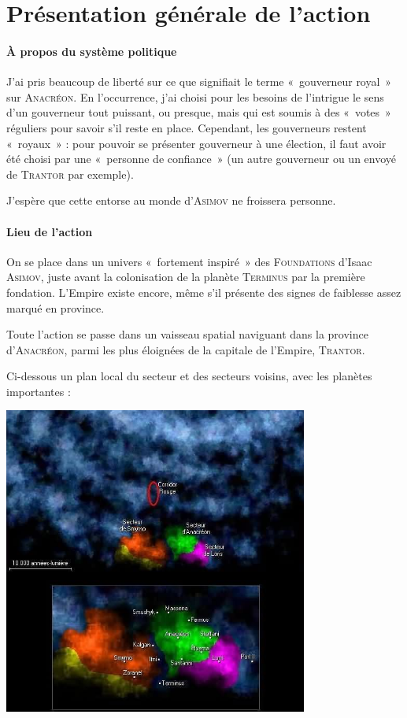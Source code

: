 \documentclass{article}
\begin{document}
\section{Présentation générale de l’action}

\paragraph{À propos du système politique}
{
J’ai pris beaucoup de liberté sur ce que signifiait le terme «~gouverneur royal~» sur \textsc{Anacréon}.
En l’occurrence, j’ai choisi pour les besoins de l’intrigue le sens d’un gouverneur tout puissant, ou presque, mais qui est soumis à des «~votes~» réguliers pour savoir s’il reste en place.
Cependant, les gouverneurs restent «~royaux~» : pour pouvoir se présenter gouverneur à une élection, il faut avoir été choisi par une «~personne de confiance~» (un autre gouverneur ou un envoyé de \textsc{Trantor} par exemple).

J’espère que cette entorse au monde d’\textsc{Asimov} ne froissera personne.
}

\paragraph{Lieu de l’action}
{
On se place dans un univers «~fortement inspiré~» des \textsc{Foundations} d’Isaac \textsc{Asimov}, juste avant la colonisation de la planète \textsc{Terminus} par la première fondation. L’Empire existe encore, même s’il présente des signes de faiblesse assez marqué en province.

Toute l’action se passe dans un vaisseau spatial naviguant dans la province d’\textsc{Anacréon}, parmi les plus éloignées de la capitale de l’Empire, \textsc{Trantor}.

Ci-dessous un plan local du secteur et des secteurs voisins, avec les planètes importantes :
\begin{center}
	\includegraphics[width=10cm]{galactographie.png}
\end{center}
}
\end{document}
